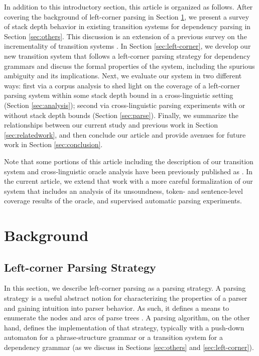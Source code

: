 \documentclass[english]{jnlp_1.4}
\begin{document}
In addition to this introductory section, this article is organized as follows.
After covering the background of left-corner parsing in Section \ref{sec:background}, we present a survey of stack depth behavior in existing transition systems for dependency parsing in Section \ref{sec:others}.
This discussion is an extension of a previous survey on the incrementality of transition systems \cite{nivre:2004:IncrementalParsing}.
In Section \ref{sec:left-corner}, we develop our new transition system that follows a left-corner parsing strategy for dependency grammars and discuss the formal properties of the system, including the spurious ambiguity and its implications.
Next, we evaluate our system in two different ways: first via a corpus analysis to shed light on the coverage of a left-corner parsing system within some stack depth bound in a cross-linguistic setting (Section \ref{sec:analysis});
second via cross-linguistic parsing experiments with or without stack depth bounds (Section \ref{sec:parse}).
Finally, we summarize the relationships between our current study and previous work in Section \ref{sec:relatedwork}, and then conclude our article and provide avenues for future work in Section \ref{sec:conclusion}.

Note that some portions of this article including the description of our transition system and cross-linguistic oracle analysis have been previously published as .
In the current article, we extend that work with a more careful formalization of our system that includes an analysis of its unsoundness, token- and sentence-level coverage results of the oracle, and supervised automatic parsing experiments.


\section{Background}
\label{sec:background}

\subsection{Left-corner Parsing Strategy}

In this section, we describe left-corner parsing as a parsing strategy.
A parsing strategy is a useful abstract notion for characterizing the properties of a parser and gaining intuition into parser behavior.
As such, it defines a means to enumerate the nodes and arcs of parse trees \cite{abney91memory}.
A parsing algorithm, on the other hand, defines the implementation of that strategy, typically with a push-down automaton for a phrase-structure grammar or a transition system for a dependency grammar (as we discuss in Sections \ref{sec:others} and \ref{sec:left-corner}).
\end{document}
